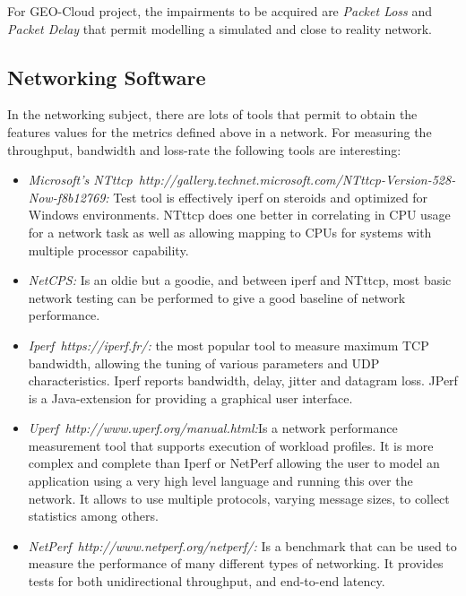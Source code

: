 For GEO-Cloud project, the impairments to be acquired are \emph{Packet Loss} and
\emph{Packet Delay} that permit modelling a simulated and close to reality network.


\subsection{Networking Software}

In the networking subject, there are lots of tools that permit to obtain the
features values for the metrics defined above in a network. 
For measuring the throughput, bandwidth and loss-rate the following tools are interesting:

\begin{itemize}
\item \emph{Microsoft's NTttcp~{http://gallery.technet.microsoft.com/NTttcp-Version-528-Now-f8b12769}:} Test tool is effectively iperf on steroids and
  optimized for Windows environments. NTttcp does one better in correlating in
  CPU usage for a network task as well as allowing mapping to CPUs for systems
  with multiple processor capability. 
\item \emph{NetCPS:} Is an oldie but a goodie, and between iperf and NTttcp,
  most basic network testing can be performed to give a good baseline of network
  performance.
\item \emph{Iperf~{https://iperf.fr/}:} the most popular tool to measure maximum TCP bandwidth, allowing the
  tuning of various parameters and UDP characteristics. Iperf reports
  bandwidth, delay, jitter and datagram loss. JPerf is a Java-extension for
  providing a graphical user interface.
\item \emph{Uperf~{http://www.uperf.org/manual.html}:}Is a network
  performance measurement tool that supports execution of workload profiles. It
  is more complex and complete than Iperf or NetPerf allowing the user to model
  an application using a very high level language and running this over the
  network. It allows to use multiple protocols, varying message sizes, to
  collect statistics among others.
\item \emph{NetPerf~{http://www.netperf.org/netperf/}:} Is a benchmark that can be used to measure the performance of many different types of networking. It provides tests for both unidirectional throughput, and end-to-end latency.
\end{itemize}


